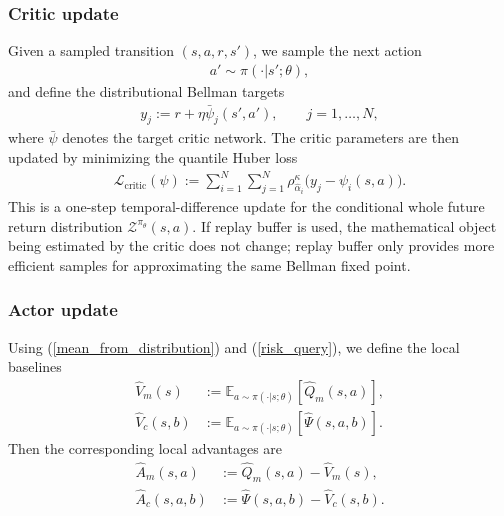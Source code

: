\subsubsection{Critic update}

Given a sampled transition $(s,a,r,s')$, we sample the next action
\begin{align}
    a'\sim \pi(\cdot|s';\theta),
\end{align}
and define the distributional Bellman targets
\begin{align}
    y_j:=r+\eta \bar{\psi}_j(s',a'),
    \qquad j=1,\dots,N,
\end{align}
where $\bar{\psi}$ denotes the target critic network. The critic parameters are then updated by minimizing the quantile Huber loss
\begin{align}
    \mathcal{L}_{\mathrm{critic}}(\psi)
    :=
    \sum_{i=1}^{N}\sum_{j=1}^{N}
    \rho_{\hat{\alpha}_i}^{\kappa}\bigl(
        y_j-\psi_i(s,a)
    \bigr).
\end{align}
This is a one-step temporal-difference update for the conditional whole future return distribution $\mathcal{Z}^{\pi_{\theta}}(s,a)$. If replay buffer is used, the mathematical object being estimated by the critic does not change; replay buffer only provides more efficient samples for approximating the same Bellman fixed point.

\subsubsection{Actor update}

Using (\ref{mean_from_distribution}) and (\ref{risk_query}), we define the local baselines
\begin{align}
    \widehat{V}_m(s)
    &:=
    \mathbb{E}_{a\sim\pi(\cdot|s;\theta)}[\widehat{Q}_m(s,a)],\\
    \widehat{V}_c(s,b)
    &:=
    \mathbb{E}_{a\sim\pi(\cdot|s;\theta)}[\widehat{\Psi}(s,a,b)].
\end{align}
Then the corresponding local advantages are
\begin{align}
    \widehat{A}_m(s,a)
    &:=
    \widehat{Q}_m(s,a)-\widehat{V}_m(s),\\
    \widehat{A}_c(s,a,b)
    &:=
    \widehat{\Psi}(s,a,b)-\widehat{V}_c(s,b).
\end{align}

